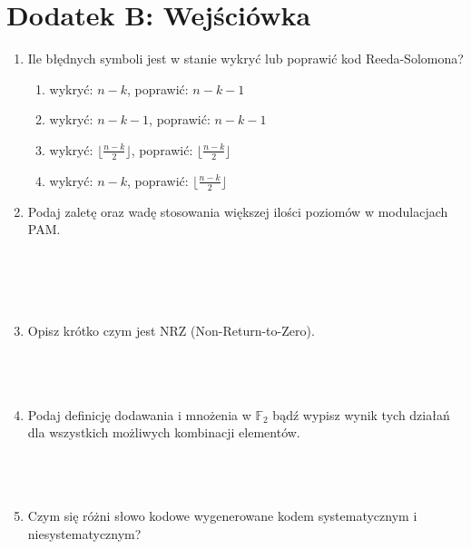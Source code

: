 \setcounter{secnumdepth}{0}
\section*{Dodatek B: Wejściówka}

\begin{enumerate}
    \item Ile błędnych symboli jest w stanie wykryć lub poprawić kod Reeda-Solomona?
    \begin{enumerate}[label=\Alph*)]
        \item wykryć: $n-k$, poprawić: $n-k-1$
        \item wykryć: $n-k-1$, poprawić: $n-k-1$
        \item wykryć: $\lfloor \frac{n-k}{2} \rfloor$, poprawić: $\lfloor \frac{n-k}{2} \rfloor$
        \item wykryć: $n-k$, poprawić: $\lfloor \frac{n-k}{2} \rfloor$
    \end{enumerate}
    \item Podaj zaletę oraz wadę stosowania większej ilości poziomów w modulacjach PAM.\\ \\ \\ \\ \\
    \item Opisz krótko czym jest NRZ (Non-Return-to-Zero).\\ \\ \\ \\
    \item Podaj definicję dodawania i mnożenia w $\mathbb{F}_2$ bądź wypisz wynik tych działań dla wszystkich możliwych kombinacji elementów. \\ \\ \\ \\
    \item Czym się różni słowo kodowe wygenerowane kodem systematycznym i niesystematycznym?
\end{enumerate}

